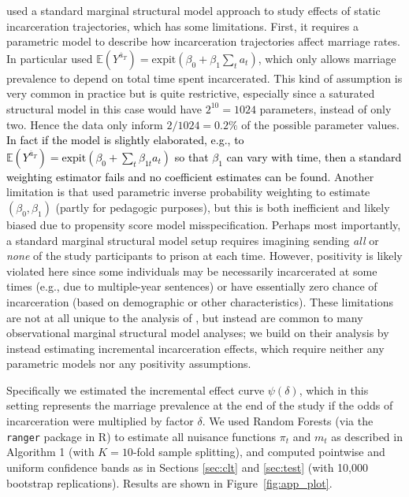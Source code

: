 \documentclass[12pt]{article}
\newcommand{\E}{\mathbb{E}}
\def\expit{\text{expit}}
\theoremstyle{remark}
\begin{document}
\textcite{bacak2015marginal} used a standard marginal structural model approach to study effects of static incarceration trajectories, which has some limitations. First, it requires a parametric model to describe how incarceration trajectories affect marriage rates. In particular \textcite{bacak2015marginal} used $\E(Y^{\overline{a}_T}) = \expit( \beta_0 + \beta_1 \sum_t a_t)$, which only allows marriage prevalence to depend on total time spent incarcerated. This kind of assumption is very common in practice but is quite restrictive, especially since a saturated structural model in this case would have $2^{10}=1024$ parameters, instead of only two. Hence the data only inform $2/1024=0.2\%$ of the possible parameter values. \textcolor{black}{In fact if the model is slightly elaborated, e.g., to $\E(Y^{\overline{a}_T}) = \expit( \beta_0 + \sum_t \beta_{1t} a_t)$ so that $\beta_1$ can vary with time, then a standard weighting  estimator fails and no coefficient estimates can be found.}  Another limitation is that \textcite{bacak2015marginal} used parametric inverse probability weighting to estimate $(\beta_0,\beta_1)$ (partly for pedagogic purposes), but this is both inefficient and likely biased due to propensity score model misspecification. Perhaps most importantly, a standard marginal structural model setup requires imagining sending \textit{all} or \textit{none} of the study participants to prison at each time. However, positivity is likely violated here since some individuals may be necessarily incarcerated at some times (e.g., due to multiple-year sentences) or have essentially zero chance of incarceration (based on demographic or other characteristics).  These limitations are not at all unique to the analysis of \textcite{bacak2015marginal}, but instead are common to many observational marginal structural model analyses; we build on their analysis by instead estimating incremental incarceration effects, which require neither any parametric models nor any positivity assumptions. 

Specifically we estimated the incremental effect curve $\psi(\delta)$, which in this setting represents the marriage prevalence at the end of the study if the odds of incarceration were multiplied by factor $\delta$. We used Random Forests (via the \verb|ranger| package in R) to estimate all nuisance functions $\pi_t$ and $m_t$ as described in Algorithm 1 (with $K=10$-fold sample splitting), and computed pointwise and uniform confidence bands as in Sections \ref{sec:clt} and  \ref{sec:test} (with 10,000 bootstrap replications). Results are shown in Figure~\ref{fig:app_plot}.
\end{document}
